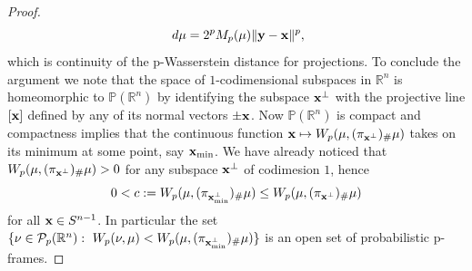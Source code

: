 \documentclass{amsart}
\numberwithin{equation}{section}
\newcommand\cP{{\mathcal P}}
\newcommand\R{{\mathbb R}}
\renewcommand\min{{\operatorname{min}}}
\theoremstyle{plain}
\theoremstyle{definition}
\begin{document}
\begin{proof}
\[ \ d\mu  =2^p M_p(\mu) \|{\bf y}-{\bf x}\|^p,
\]
which is continuity of the p-Wasserstein distance for projections. 
To conclude the argument we note that the space of $1$-codimensional subspaces in $\mathbb{R}^n$ is homeomorphic to    
$\mathbb{P}(\R^n)$ by identifying the subspace ${\bf x}^{\perp} $ with the projective line $ [{\bf x}]$ defined by any of its 
normal vectors $\pm {\bf x}$. Now $\mathbb{P}(\R^n)$ is compact and compactness implies that the continuous function ${\bf x} \mapsto W_p(\mu, (\pi_{{\bf x}^{\perp}})_{\#}\mu)$ takes on its minimum at some point, say ${\bf x}_{\min}$. 
We have already noticed that $W_p(\mu, (\pi_{{\bf x}^{\perp}})_{\#}\mu)>0$ for any subspace ${\bf x}^{\perp}$ of codimesion $1$, hence 
$$0 < c := W_p(\mu, (\pi_{{\bf x}^{\perp}_{\min}})_{\#}\mu) \leq W_p(\mu, (\pi_{{\bf x}^{\perp}})_{\#} \mu)$$ 
for all ${\bf x} \in S^{n-1}$. In particular the set $\{\nu \in \cP_p(\R^n):\  W_p(\nu, \mu) <  W_p(\mu, (\pi_{{\bf x}^{\perp}_{\min}})_{\#}\mu) \}$ 
is an open set of probabilistic p-frames. 
\end{proof}
\end{document}
